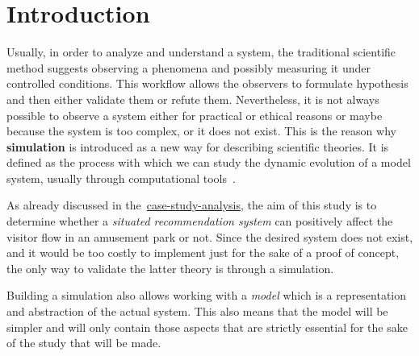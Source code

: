 \section{Introduction}\label{sec:introduction}

Usually, in order to analyze and understand a system, the traditional scientific method suggests observing a phenomena and possibly measuring it under controlled conditions.
This workflow allows the observers to formulate hypothesis and then either validate them or refute them.
Nevertheless, it is not always possible to observe a system either for practical or ethical reasons or maybe because the system is too complex, or it does not exist.
This is the reason why \textbf{simulation} is introduced as a new way for describing scientific theories.
It is defined as the process with which we can study the dynamic evolution of a model system, usually through computational tools~\cite{parisi_2001}.

As already discussed in the~\href{https://github.com/ICPS-MicroCity/case-study-analysis/releases/tag/v0.2.1}{case-study-analysis}, the aim of this study is to determine whether a \textit{situated recommendation system} can positively affect the visitor flow in an amusement park or not.
Since the desired system does not exist, and it would be too costly to implement just for the sake of a proof of concept, the only way to validate the latter theory is through a simulation.

Building a simulation also allows working with a \textit{model} which is a representation and abstraction of the actual system.
This also means that the model will be simpler and will only contain those aspects that are strictly essential for the sake of the study that will be made.
